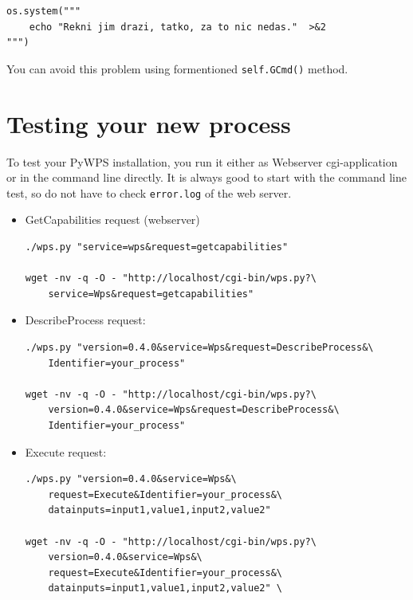 \documentclass[a4paper,11pt]{article}
\begin{document}
\begin{verbatim}
os.system("""
    echo "Rekni jim drazi, tatko, za to nic nedas."  >&2
""")
\end{verbatim}

You can avoid this problem using formentioned \texttt{self.GCmd()} method.


\section{Testing your new process}

To test your PyWPS installation, you run it either as Webserver
cgi-application or in the command line directly. It is always good to start
with the command line test, so do not have to check \texttt{error.log} of
the web server.

\begin{itemize}
    \item GetCapabilities request (webserver)
\begin{verbatim}
./wps.py "service=wps&request=getcapabilities"

wget -nv -q -O - "http://localhost/cgi-bin/wps.py?\
    service=Wps&request=getcapabilities"
\end{verbatim}
        
    \item DescribeProcess request:
\begin{verbatim}
./wps.py "version=0.4.0&service=Wps&request=DescribeProcess&\
    Identifier=your_process"

wget -nv -q -O - "http://localhost/cgi-bin/wps.py?\
    version=0.4.0&service=Wps&request=DescribeProcess&\
    Identifier=your_process"
\end{verbatim}
        
    \item Execute request:
\begin{verbatim}
./wps.py "version=0.4.0&service=Wps&\
    request=Execute&Identifier=your_process&\
    datainputs=input1,value1,input2,value2"

wget -nv -q -O - "http://localhost/cgi-bin/wps.py?\
    version=0.4.0&service=Wps&\
    request=Execute&Identifier=your_process&\
    datainputs=input1,value1,input2,value2" \
\end{verbatim}
        
\end{itemize}


\end{document}
